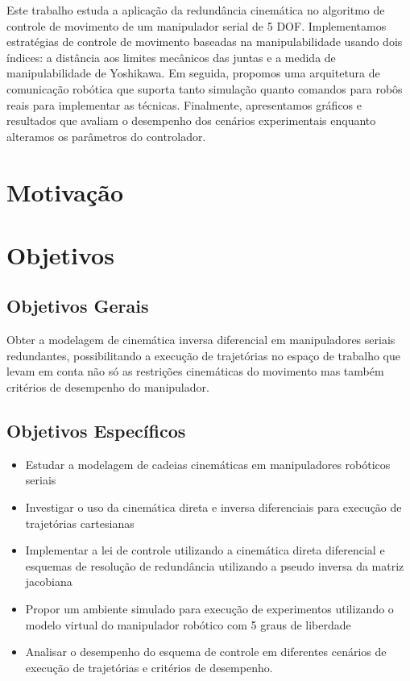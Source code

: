 Este trabalho estuda a aplicação da redundância cinemática no algoritmo de controle de movimento de um manipulador serial de 5 DOF.
Implementamos estratégias de controle de movimento baseadas na manipulabilidade usando dois índices: a distância aos limites mecânicos
das juntas e a medida de manipulabilidade de Yoshikawa. Em seguida, propomos uma arquitetura de comunicação robótica que suporta tanto
simulação quanto comandos para robôs reais para implementar as técnicas. Finalmente, apresentamos gráficos e resultados que avaliam o
desempenho dos cenários experimentais enquanto alteramos os parâmetros do controlador.

\section{Motivação}\label{sec:motivation}

\section{Objetivos}\label{sec:objectives}

\subsection{Objetivos Gerais}

Obter a modelagem de cinemática inversa diferencial em manipuladores seriais redundantes, possibilitando a execução de
trajetórias no espaço de trabalho que levam em conta não só as restrições cinemáticas do movimento mas também critérios
de desempenho do manipulador.

\subsection{Objetivos Específicos}
\begin{itemize}
	\item Estudar a modelagem de cadeias cinemáticas em manipuladores robóticos seriais
	\item Investigar o uso da cinemática direta e inversa diferenciais para execução de trajetórias cartesianas
	\item Implementar a lei de controle utilizando a cinemática direta diferencial e esquemas de resolução de redundância utilizando a pseudo inversa da matriz jacobiana
	\item Propor um ambiente simulado para execução de experimentos utilizando o modelo virtual do manipulador robótico com 5 graus de liberdade
	\item Analisar o desempenho do esquema de controle em diferentes cenários de execução de trajetórias e critérios de desempenho.
\end{itemize}

